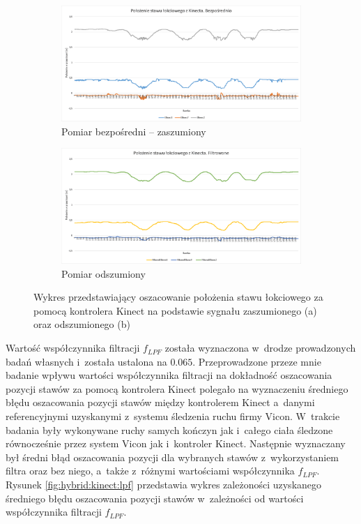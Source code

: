 \begin{figure}[!htb]
	\centering
	\begin{subfigure}[b]{0.49\textwidth}
		\centering
		\includegraphics[width=\linewidth]{images/kinectElbowRaw.png}	
		\caption{Pomiar bezpośredni -- zaszumiony}
		\label{fig:hybrid:kinect:noised}
	\end{subfigure}
	\begin{subfigure}[b]{0.49\textwidth}
		\centering
		\includegraphics[width=\linewidth]{images/kinectElbowFiltered.png}	
		\caption{Pomiar odszumiony}
		\label{fig:hybrid:kinect:denoised}
	\end{subfigure}				
	\caption{Wykres przedstawiający oszacowanie położenia stawu łokciowego za pomocą kontrolera Kinect na podstawie sygnału zaszumionego (a) oraz odszumionego (b)}
\end{figure}

Wartość współczynnika filtracji $f_{LPF}$ została wyznaczona w~drodze prowadzonych badań własnych i~została ustalona na $0.065$. Przeprowadzone przeze mnie badanie 
wpływu wartości współczynnika filtracji na dokładność oszacowania pozycji stawów za pomocą kontrolera Kinect polegało na wyznaczeniu średniego błędu oszacowania pozycji stawów między kontrolerem Kinect a~danymi referencyjnymi uzyskanymi z~systemu śledzenia ruchu firmy Vicon. W~trakcie badania były wykonywane ruchy samych kończyn jak i~całego ciała śledzone równocześnie przez system Vicon jak i~kontroler Kinect. Następnie wyznaczany był średni błąd oszacowania pozycji dla wybranych stawów z~wykorzystaniem filtra oraz bez niego, a~także z~różnymi wartościami współczynnika $f_{LPF}$. Rysunek \ref{fig:hybrid:kinect:lpf} przedstawia wykres zależoności uzyskanego średniego błędu oszacowania pozycji stawów w~zależności od wartości współczynnika filtracji $f_{LPF}$.

